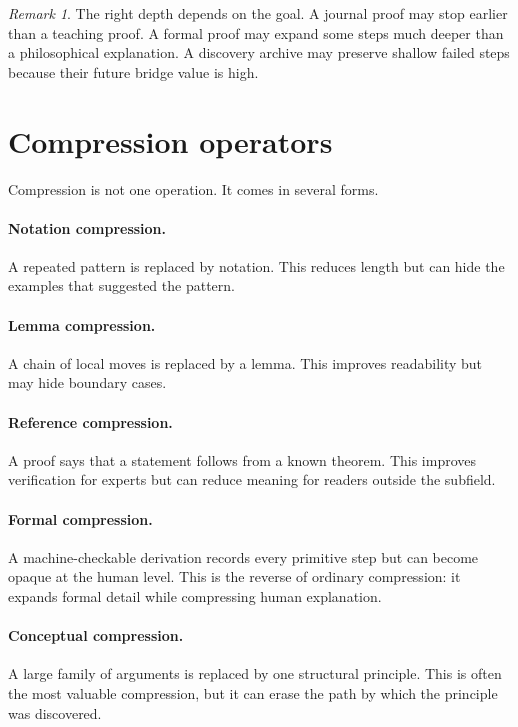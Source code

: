 \documentclass[11pt,oneside]{book}
\theoremstyle{remark}
\newtheorem{remark}[definition]{Remark}
\begin{document}
\begin{remark}
The right depth depends on the goal.  A journal proof may stop earlier than a teaching proof.  A formal proof may expand some steps much deeper than a philosophical explanation.  A discovery archive may preserve shallow failed steps because their future bridge value is high.
\end{remark}

\section{Compression operators}

Compression is not one operation.  It comes in several forms.

\paragraph{Notation compression.}
A repeated pattern is replaced by notation.  This reduces length but can hide the examples that suggested the pattern.

\paragraph{Lemma compression.}
A chain of local moves is replaced by a lemma.  This improves readability but may hide boundary cases.

\paragraph{Reference compression.}
A proof says that a statement follows from a known theorem.  This improves verification for experts but can reduce meaning for readers outside the subfield.

\paragraph{Formal compression.}
A machine-checkable derivation records every primitive step but can become opaque at the human level.  This is the reverse of ordinary compression: it expands formal detail while compressing human explanation.

\paragraph{Conceptual compression.}
A large family of arguments is replaced by one structural principle.  This is often the most valuable compression, but it can erase the path by which the principle was discovered.
\end{document}

